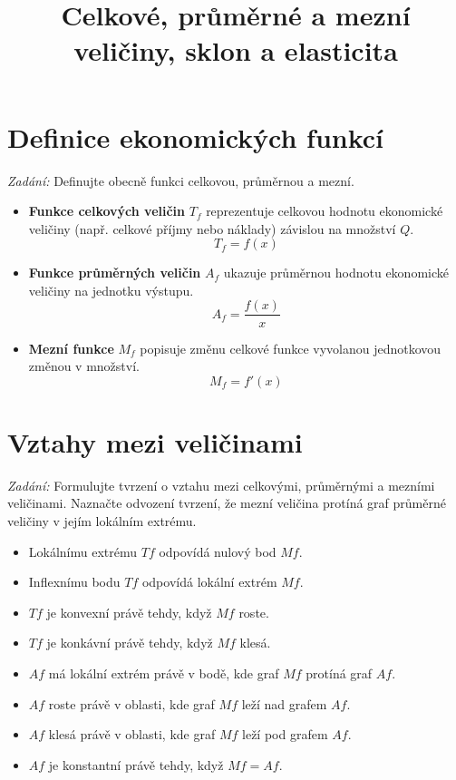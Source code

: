 \documentclass{article}
\title{Celkové, průměrné a mezní veličiny, sklon a elasticita}
\author{}
\date{}
\begin{document}
\maketitle

\section{Definice ekonomických funkcí}
\textit{Zadání:} Definujte obecně funkci celkovou, průměrnou a mezní.
\begin{itemize}
    \item \textbf{Funkce celkových veličin} \(T_f\) reprezentuje celkovou hodnotu ekonomické veličiny (např. celkové příjmy nebo náklady) závislou na množství \(Q\).
    $$ T_f = f(x) $$
    \item \textbf{Funkce průměrných veličin} $A_f$ ukazuje průměrnou hodnotu ekonomické veličiny na jednotku výstupu.
    $$ A_f = \frac{f(x)}{x} $$
    \item \textbf{Mezní funkce} \(M_f\) popisuje změnu celkové funkce vyvolanou jednotkovou změnou v množství.
    $$ M_f = f'(x) $$
\end{itemize}

\section{Vztahy mezi veličinami}
\textit{Zadání:} Formulujte tvrzení o vztahu mezi celkovými, průměrnými a mezními veličinami. Naznačte odvození tvrzení, že mezní veličina protíná graf průměrné veličiny v jejím lokálním extrému.

\begin{itemize}
    \item Lokálnímu extrému $Tf$ odpovídá nulový bod $Mf$.
    \item Inflexnímu bodu $Tf$ odpovídá lokální extrém $Mf$.
    \item $Tf$ je konvexní právě tehdy, když $Mf$ roste.
    \item $Tf$ je konkávní právě tehdy, když $Mf$ klesá.
    \item $Af$ má lokální extrém právě v bodě, kde graf $Mf$ protíná graf $Af$.
    \item $Af$ roste právě v oblasti, kde graf $Mf$ leží nad grafem $Af$.
    \item $Af$ klesá právě v oblasti, kde graf $Mf$ leží pod grafem $Af$.
    \item $Af$ je konstantní právě tehdy, když $Mf = Af$.
\end{itemize}
\end{document}

